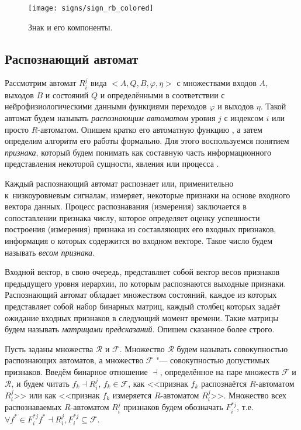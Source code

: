 \begin{figure}[h]
	\centering
    \texttt{[image: signs/sign\_rb\_colored]}
    \caption{Знак и его компоненты.}
    \label{fg:sign_rb}
\end{figure}

\subsection{Распознающий автомат} \label{sect:recogn_block}
Рассмотрим автомат $R_i^j$ вида $<A,Q,B,\varphi,\eta>$ с множествами входов $A$, выходов $B$ и состояний $Q$ и определёнными в соответствии с нейрофизиологическими данными функциями переходов $\varphi$ и выходов $\eta$. Такой автомат будем называть \textit{распознающим автоматом} уровня $j$ с индексом $i$ или просто $R$-автоматом. Опишем кратко его автоматную функцию \cite{Kudryavtcev1985}, а затем определим алгоритм его работы формально.  Для этого воспользуемся понятием \textit{признака}, который будем понимать как составную часть информационного представления некоторой сущности, явления или процесса \cite{Vapnik1974}.

Каждый распознающий автомат распознает или, применительно к~низкоуровневым сигналам, измеряет, некоторые признаки на основе входного вектора данных.  Процесс распознавания (измерения) заключается в сопоставлении признака числу, которое определяет оценку успешности построения (измерения) признака из составляющих его входных признаков, информация о которых содержится во входном векторе. Такое число будем называть \textit{весом признака}.

Входной вектор, в свою очередь, представляет собой вектор весов признаков предыдущего уровня иерархии, по которым распознаются выходные признаки. Распознающий автомат обладает множеством состояний, каждое из которых представляет собой набор бинарных матриц, каждый столбец которых задаёт ожидание входных признаков в следующий момент времени. Такие матрицы будем называть \textit{матрицами предсказаний}. Опишем сказанное более строго.

Пусть заданы множества $\mathcal R$ и $\mathcal F$. Множество $\mathcal R$ будем называть совокупностью распознающих автоматов, а множество $\mathcal F$ "--- совокупностью допустимых признаков. Введём бинарное отношение $\dashv$, определённое на паре множеств $\mathcal F$ и $\mathcal R$, и будем читать $f_k\dashv R_i^j$, $f_k\in\mathcal F$, как <<признак $f_k$ распознаётся $R$-автоматом $R_i^j$>> или как <<признак $f_k$ измеряется $R$-автоматом $R_i^j$>>. Множество всех распознаваемых $R$-автоматом $R_i^j$ признаков будем обозначать $F_i^{*j}$, т.е. ${\forall}f^*{\in}F_i^{*j} f^*{\dashv}R_i^j, F_i^{*j}{\subseteq}\mathcal F$.

